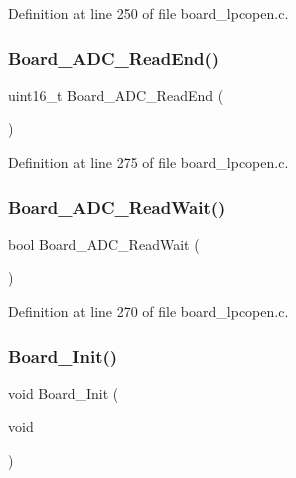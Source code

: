 Definition at line 250 of file board\+\_\+lpcopen.\+c.

\mbox{\label{group__hal_ga51147ea5d2ae45e50453fbdd4e2c590d}} 
\subsubsection{\texorpdfstring{Board\+\_\+\+A\+D\+C\+\_\+\+Read\+End()}{Board\_ADC\_ReadEnd()}}
{\footnotesize\ttfamily uint16\+\_\+t Board\+\_\+\+A\+D\+C\+\_\+\+Read\+End (\begin{DoxyParamCaption}{ }\end{DoxyParamCaption})}



Definition at line 275 of file board\+\_\+lpcopen.\+c.

\mbox{\label{group__hal_ga0e575f815466079643b007d0279f28bf}} 
\subsubsection{\texorpdfstring{Board\+\_\+\+A\+D\+C\+\_\+\+Read\+Wait()}{Board\_ADC\_ReadWait()}}
{\footnotesize\ttfamily bool Board\+\_\+\+A\+D\+C\+\_\+\+Read\+Wait (\begin{DoxyParamCaption}{ }\end{DoxyParamCaption})}



Definition at line 270 of file board\+\_\+lpcopen.\+c.

\mbox{\label{group__hal_gae8d2d761b984f48c3dbb27dd32a8c119}} 
\subsubsection{\texorpdfstring{Board\+\_\+\+Init()}{Board\_Init()}}
{\footnotesize\ttfamily void Board\+\_\+\+Init (\begin{DoxyParamCaption}\item[{void}]{ }\end{DoxyParamCaption})}



